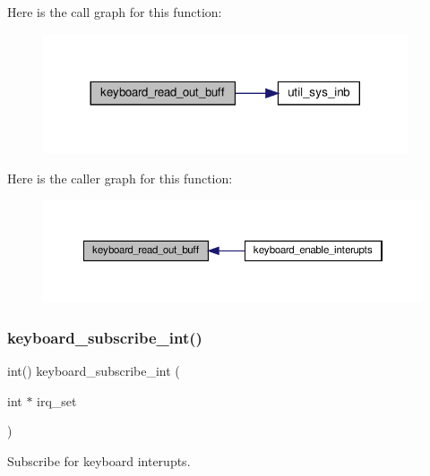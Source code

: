 Here is the call graph for this function\+:\nopagebreak
\begin{figure}[H]
\begin{center}
\leavevmode
\includegraphics[width=305pt]{group__keyboard_ga01f4a2303581946d7d26fdb5ac7c0caf_cgraph}
\end{center}
\end{figure}
Here is the caller graph for this function\+:\nopagebreak
\begin{figure}[H]
\begin{center}
\leavevmode
\includegraphics[width=350pt]{group__keyboard_ga01f4a2303581946d7d26fdb5ac7c0caf_icgraph}
\end{center}
\end{figure}
\mbox{\label{group__keyboard_gaefd0e3aafc75eb71df4d778f356b6dd7}} 
\subsubsection{\texorpdfstring{keyboard\+\_\+subscribe\+\_\+int()}{keyboard\_subscribe\_int()}}
{\footnotesize\ttfamily int() keyboard\+\_\+subscribe\+\_\+int (\begin{DoxyParamCaption}\item[{int $\ast$}]{irq\+\_\+set }\end{DoxyParamCaption})}



Subscribe for keyboard interupts. 

